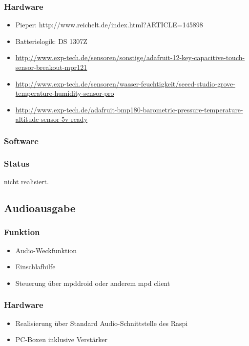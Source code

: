 \documentclass[a4paper,twoside,titlepage,normalheadings,tocleft,bibtotoc]{scrartcl}
\begin{document}
\begin{itemize}
\subsubsection{Hardware}
\begin{itemize}
\item Pieper: http://www.reichelt.de/index.html?ARTICLE=145898
\item Batterielogik: DS 1307Z
\item \url{http://www.exp-tech.de/sensoren/sonstige/adafruit-12-key-capacitive-touch-sensor-breakout-mpr121}
\item \url{http://www.exp-tech.de/sensoren/wasser-feuchtigkeit/seeed-studio-grove-temperature-humidity-sensor-pro}
\item \url{http://www.exp-tech.de/adafruit-bmp180-barometric-pressure-temperature-altitude-sensor-5v-ready}
\end{itemize}

\subsubsection{Software}
\subsubsection{Status}
nicht realisiert.

\subsection{Audioausgabe}
\subsubsection{Funktion}
\begin{itemize}
\item Audio-Weckfunktion
\item Einschlafhilfe
\item Steuerung über mpddroid oder anderem mpd client
\end{itemize}

\subsubsection{Hardware}
\begin{itemize}
\item Realisierung über Standard Audio-Schnittstelle des Raspi
\item PC-Boxen inklusive Verstärker
\end{itemize}


\end{itemize}
\end{document}
